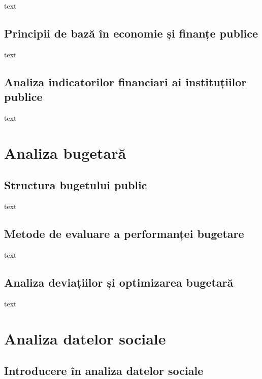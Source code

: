 \documentclass[
  11pt,
  b5paper,
  nottoc]{book}
\begin{document}
text

\section{Principii de bază în economie și finanțe
publice}\label{principii-de-bazux103-uxeen-economie-ux219i-finanux21be-publice}

text

\section{Analiza indicatorilor financiari ai instituțiilor
publice}\label{analiza-indicatorilor-financiari-ai-instituux21biilor-publice}

text


\chapter{Analiza bugetară}\label{cap5}

\section{Structura bugetului public}\label{structura-bugetului-public}

text

\section{Metode de evaluare a performanței
bugetare}\label{metode-de-evaluare-a-performanux21bei-bugetare}

text

\section{Analiza deviațiilor și optimizarea
bugetară}\label{analiza-deviaux21biilor-ux219i-optimizarea-bugetarux103}

text


\chapter{Analiza datelor sociale}\label{cap6}

\section{Introducere în analiza datelor
sociale}\label{introducere-uxeen-analiza-datelor-sociale}
\end{document}
